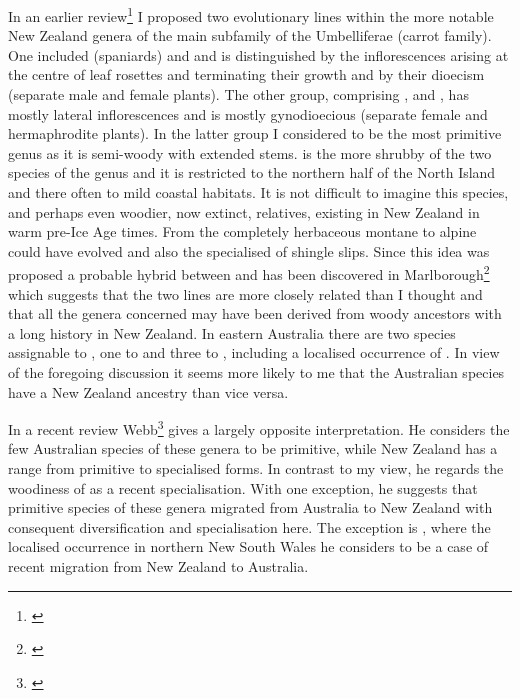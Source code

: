 In an earlier review\footnote{\cite{dawson1971relationships}} I proposed two evolutionary lines within the more notable New Zealand genera of the main subfamily of the Umbelliferae (carrot family).
One included  (spaniards) and  and is distinguished by the inflorescences arising at the centre of leaf rosettes and terminating their growth and by their dioecism (separate male and female plants).
The other group, comprising ,  and , has mostly lateral inflorescences and is mostly gynodioecious (separate female and hermaphrodite plants).
In the latter group I considered  to be the most primitive genus as it is semi-woody with extended stems.  is the more shrubby of the two species of the genus and it is restricted to the northern half of the North Island and there often to mild coastal habitats.
It is not difficult to imagine this species, and perhaps even woodier, now extinct, relatives, existing in New Zealand in warm pre-Ice Age times.
From  the completely herbaceous montane to alpine  could have evolved and also the specialised  of shingle slips.
Since this idea was proposed a probable hybrid between  and  has been discovered in Marlborough\footnote{\cite{webb1984natural}} which suggests that the two lines are more closely related than I thought and that all the genera concerned may have been derived from woody ancestors with a long history in New Zealand.
In eastern Australia there are two species assignable to , one to  and three to , including a localised occurrence of .
In view of the foregoing discussion it seems more likely to me that the Australian species have a New Zealand ancestry than vice versa.

In a recent review Webb\footnote{\cite{webb1986breeding}} gives a largely opposite interpretation.
He considers the few Australian species of these genera to be primitive, while New Zealand has a range from primitive to specialised forms.
In contrast to my view, he regards the woodiness of  as a recent specialisation.
With one exception, he suggests that primitive species of these genera migrated from Australia to New Zealand with consequent diversification and specialisation here.
The exception is , where the localised occurrence in northern New South Wales he considers to be a case of recent migration from New Zealand to Australia.

